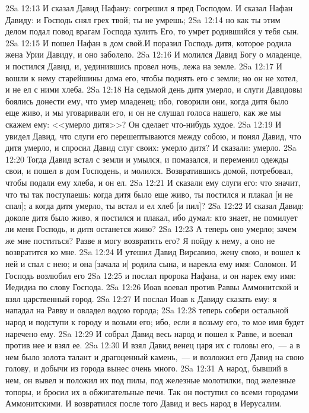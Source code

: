 \vs 2Sa 12:13 И сказал Давид Нафану: согрешил я пред Господом. И сказал Нафан Давиду: и Господь снял  грех твой; ты не умрешь;
\vs 2Sa 12:14 но как ты этим делом подал повод врагам Господа хулить Его, то умрет родившийся у тебя сын.
\vs 2Sa 12:15 И пошел Нафан в дом свой.\rsbpar И поразил Господь дитя, которое родила жена Урии Давиду, и оно заболело.
\vs 2Sa 12:16 И молился Давид Богу о младенце, и постился Давид, и, уединившись провел ночь, лежа на земле.
\vs 2Sa 12:17 И вошли к нему старейшины дома его, чтобы поднять его с земли; но он не хотел, и не ел с ними хлеба.
\vs 2Sa 12:18 На седьмой день дитя умерло, и слуги Давидовы боялись донести ему, что умер младенец; ибо, говорили они, когда дитя было еще живо, и мы уговаривали его, и он не слушал голоса нашего, как же мы скажем ему: <<умерло дитя>>? Он сделает что-нибудь худое.
\vs 2Sa 12:19 И увидел Давид, что слуги его перешептываются между собою, и понял Давид, что дитя умерло, и спросил Давид слуг своих: умерло дитя? И сказали: умерло.
\vs 2Sa 12:20 Тогда Давид встал с земли и умылся, и помазался, и переменил одежды свои, и пошел в дом Господень, и молился. Возвратившись домой, потребовал, чтобы подали ему хлеба, и он ел.
\vs 2Sa 12:21 И сказали ему слуги его: что значит, что ты так поступаешь: когда дитя было еще живо, ты постился и плакал [и не спал]; а когда дитя умерло, ты встал и ел хлеб [и пил]?
\vs 2Sa 12:22 И сказал Давид: доколе дитя было живо, я постился и плакал, ибо думал: кто знает, не помилует ли меня Господь, и дитя останется живо?
\vs 2Sa 12:23 А теперь оно умерло; зачем же мне поститься? Разве я могу возвратить его? Я пойду к нему, а оно не возвратится ко мне.
\vs 2Sa 12:24 И утешил Давид Вирсавию, жену свою, и вошел к ней и спал с нею; и она [зачала и] родила сына, и нарекла ему имя: Соломон. И Господь возлюбил его
\vs 2Sa 12:25 и послал пророка Нафана, и он нарек ему имя: Иедидиа по слову Господа.
\rsbpar\vs 2Sa 12:26 Иоав воевал против Раввы Аммонитской и взял  царственный город.
\vs 2Sa 12:27 И послал Иоав к Давиду сказать ему: я нападал на Равву и овладел водою города;
\vs 2Sa 12:28 теперь собери остальной народ и подступи к городу и возьми его; ибо, если я возьму его, то мое имя будет наречено ему.
\vs 2Sa 12:29 И собрал Давид весь народ и пошел к Равве, и воевал против нее и взял ее.
\vs 2Sa 12:30 И взял Давид венец царя их с головы его,~--- а в нем было золота талант и драгоценный камень,~--- и возложил его Давид на свою голову, и добычи из города вынес очень много.
\vs 2Sa 12:31 А народ, бывший в нем, он вывел и положил их под пилы, под железные молотилки, под железные топоры, и бросил их в обжигательные печи. Так он поступил со всеми городами Аммонитскими. И возвратился после того Давид и весь народ в Иерусалим.
